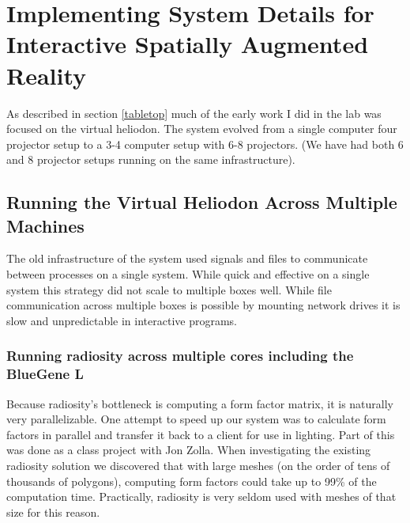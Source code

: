 \chapter{Implementing System Details for Interactive Spatially Augmented Reality}


As described in section \ref{tabletop} much of the early work I did in the lab was focused on the virtual heliodon.  The system evolved from a single computer four projector setup to a 3-4 computer setup with 6-8 projectors.  (We have had both 6 and 8 projector setups running on the same infrastructure).
\section{Running the Virtual Heliodon Across Multiple Machines}
The old infrastructure of the system used signals and files to communicate between processes on a single system.  While quick and effective on a single system this strategy did not scale to multiple boxes well.  While file communication across multiple boxes is possible by mounting network drives it is slow and unpredictable in interactive programs.
\subsection{Running radiosity across multiple cores including the BlueGene L}
Because radiosity's bottleneck is computing a form factor matrix, it is naturally very parallelizable.  One attempt to speed up our system was to calculate form factors in parallel and transfer it back to a client for use in lighting.  Part of this was done as a class project with Jon Zolla.  When investigating the existing radiosity solution we discovered that with large meshes (on the order of tens of thousands of polygons), computing form factors could take up to 99\% of the computation time.  Practically, radiosity is very seldom used with meshes of that size for this reason. 

